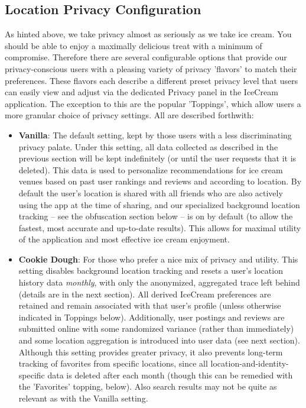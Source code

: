 \documentclass{article}
\begin{document}
\subsection{Location Privacy Configuration}
As hinted above, we take privacy almost as seriously as we take ice cream. You should be able to enjoy a maximally delicious treat with a minimum of compromise.
Therefore there are several configurable options that provide our privacy-conscious users with a pleasing variety of privacy 'flavors' to match their preferences.
These flavors each describe a different preset privacy level that users can easily view and adjust via the dedicated Privacy panel in the IceCream application.
The exception to this are the popular 'Toppings', which allow users a more granular choice of privacy settings. All are described forthwith:
\begin{itemize}
  \item \textbf{Vanilla}: The default setting, kept by those users with a less discriminating privacy palate. Under this setting, all data collected as described in the previous section will be kept indefinitely (or until the user requests that it is deleted). This data is used to personalize recommendations for ice cream venues based on past user rankings and reviews and according to location. By default the user's location is shared with all friends who are also actively using the app at the time of sharing, and our specialized background location tracking -- see the obfuscation section below -- is on by default (to allow the fastest, most accurate and up-to-date results). This allows for maximal utility of the application and most effective ice cream enjoyment.
  \item \textbf{Cookie Dough}: For those who prefer a nice mix of privacy and utility. This setting disables background location tracking and resets a user's location history data \textit{monthly}, with only the anonymized, aggregated trace left behind (details are in the next section). All derived IceCream preferences are retained and remain associated with that user's profile (unless otherwise indicated in Toppings below). Additionally, user postings and reviews are submitted online with some randomized variance (rather than immediately) and some location aggregation is introduced into user data (see next section). Although this setting provides greater privacy, it also prevents long-term tracking of favorites from specific locations, since all location-and-identity-specific data is deleted after each month (though this can be remedied with the 'Favorites' topping, below). Also search results may not be quite as relevant as with the Vanilla setting.

\end{itemize}
\end{document}
